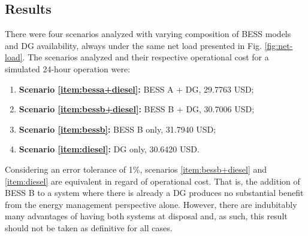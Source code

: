 \documentclass{ieeeaccess}
\begin{document}
    \subsection{Results}
    There were four scenarios analyzed with varying composition of \ac{BESS} models and \ac{DG} availability, always under the same net load presented in Fig. \ref{fig:net-load}. The scenarios analyzed and their respective operational cost for a simulated 24-hour operation were:
    \begin{enumerate}
        \item \label{item:bessa+diesel} \textbf{Scenario \ref{item:bessa+diesel}:} \ac{BESS} A + \ac{DG}, 29.7763 USD;
        \item \label{item:bessb+diesel} \textbf{Scenario \ref{item:bessb+diesel}:} \ac{BESS} B + \ac{DG}, 30.7006 USD;
        \item \label{item:bessb} \textbf{Scenario \ref{item:bessb}:} \ac{BESS} B only, 31.7940 USD;
        \item \label{item:diesel} \textbf{Scenario \ref{item:diesel}:} \ac{DG} only, 30.6420 USD.
    \end{enumerate}

    Considering an error tolerance of 1\%, scenarios \ref{item:bessb+diesel} and \ref{item:diesel} are equivalent in regard of operational cost. That is, the addition of \ac{BESS} B to a system where there is already a \ac{DG} produces no substantial benefit from the energy management perspective alone. However, there are indubitably many advantages of having both systems at disposal and, as such, this result should not be taken as definitive for all cases.
\end{document}
